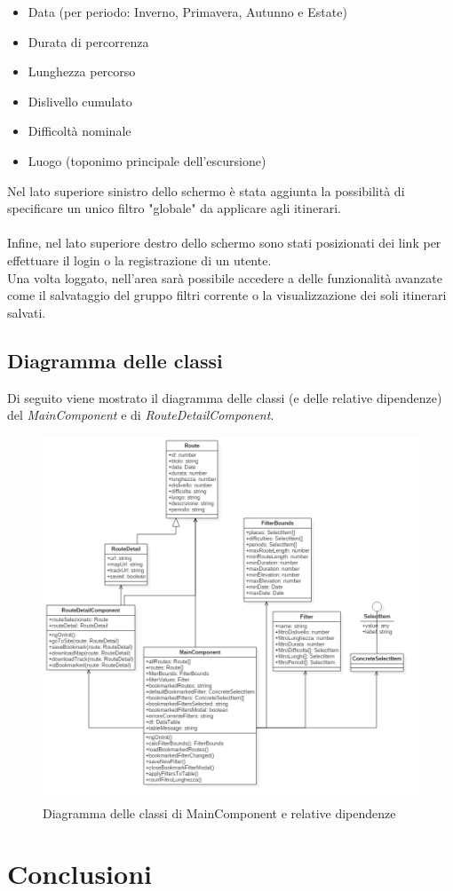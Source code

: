 \documentclass[11pt]{report}
\begin{document}
\begin{itemize}
	\item Data (per periodo: Inverno, Primavera, Autunno e Estate)
	\item Durata di percorrenza
	\item Lunghezza percorso
	\item Dislivello cumulato
	\item Difficoltà nominale
	\item Luogo (toponimo principale dell'escursione)
\end{itemize}
Nel lato superiore sinistro dello schermo è stata aggiunta la possibilità di specificare un unico filtro "globale" da applicare agli itinerari.
\\\\Infine, nel lato superiore destro dello schermo sono stati posizionati dei link per effettuare il login o la registrazione di un utente.
\\Una volta loggato, nell'area sarà possibile accedere a delle funzionalità avanzate come il salvataggio del gruppo filtri corrente o la visualizzazione dei soli itinerari salvati.
\pagebreak
\subsection{Diagramma delle classi}
Di seguito viene mostrato il diagramma delle classi (e delle relative dipendenze) del \textit{MainComponent} e di \textit{RouteDetailComponent}.
\begin{figure}[h]
	\centering
	\includegraphics[scale=0.45]{ClassDiagram_Frontend}
	\caption{Diagramma delle classi di MainComponent e relative dipendenze \label{ClassDiagram_Frontend}}
\end{figure}
\pagebreak
\section{Conclusioni}
\end{document}
